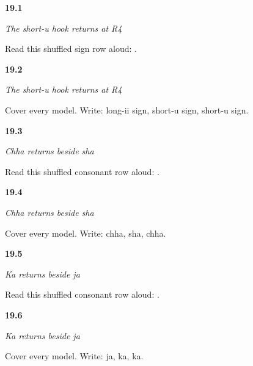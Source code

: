 \noindent\begin{minipage}[t]{\linewidth}
\raggedright
\hypertarget{review-GU-R15-u-matra-r4-reading}{\textbf{19.1}} \emph{The short-u hook returns at R4}\par
\small Read this shuffled sign row aloud:   .
\end{minipage}\par\medskip

\noindent\begin{minipage}[t]{\linewidth}
\raggedright
\hypertarget{review-GU-R15-u-matra-r4-dictation}{\textbf{19.2}} \emph{The short-u hook returns at R4}\par
\small Cover every model. Write: long-ii sign, short-u sign, short-u sign.
\end{minipage}\par\medskip

\noindent\begin{minipage}[t]{\linewidth}
\raggedright
\hypertarget{review-GU-R15-chha-r4-reading}{\textbf{19.3}} \emph{Chha returns beside sha}\par
\small Read this shuffled consonant row aloud:   .
\end{minipage}\par\medskip

\noindent\begin{minipage}[t]{\linewidth}
\raggedright
\hypertarget{review-GU-R15-chha-r4-dictation}{\textbf{19.4}} \emph{Chha returns beside sha}\par
\small Cover every model. Write: chha, sha, chha.
\end{minipage}\par\medskip

\noindent\begin{minipage}[t]{\linewidth}
\raggedright
\hypertarget{review-GU-R15-ka-r4-reading}{\textbf{19.5}} \emph{Ka returns beside ja}\par
\small Read this shuffled consonant row aloud:   .
\end{minipage}\par\medskip

\noindent\begin{minipage}[t]{\linewidth}
\raggedright
\hypertarget{review-GU-R15-ka-r4-dictation}{\textbf{19.6}} \emph{Ka returns beside ja}\par
\small Cover every model. Write: ja, ka, ka.
\end{minipage}\par\medskip

